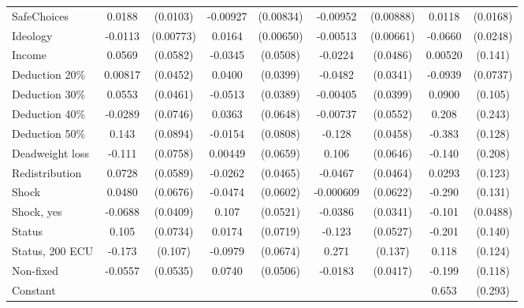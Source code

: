 \begin{tabular}{l|cccccc|cc}
SafeChoices     &   0.0188\sym{*}  & (0.0103)& -0.00927         &(0.00834)& -0.00952         &(0.00888)&   0.0118         & (0.0168)\\
Ideology        &  -0.0113         &(0.00773)&   0.0164\sym{**} &(0.00650)& -0.00513         &(0.00661)&  -0.0660\sym{**} & (0.0248)\\
Income          &   0.0569         & (0.0582)&  -0.0345         & (0.0508)&  -0.0224         & (0.0486)&  0.00520         &  (0.141)\\
Deduction 20\%&  0.00817         & (0.0452)&   0.0400         & (0.0399)&  -0.0482         & (0.0341)&  -0.0939         & (0.0737)\\
Deduction 30\%&   0.0553         & (0.0461)&  -0.0513         & (0.0389)& -0.00405         & (0.0399)&   0.0900         &  (0.105)\\
Deduction 40\%&  -0.0289         & (0.0746)&   0.0363         & (0.0648)& -0.00737         & (0.0552)&    0.208         &  (0.243)\\
Deduction 50\%&    0.143         & (0.0894)&  -0.0154         & (0.0808)&   -0.128\sym{***}& (0.0458)&   -0.383\sym{***}&  (0.128)\\
Deadweight loss&   -0.111         & (0.0758)&  0.00449         & (0.0659)&    0.106         & (0.0646)&   -0.140         &  (0.208)\\
Redistribution&   0.0728         & (0.0589)&  -0.0262         & (0.0465)&  -0.0467         & (0.0464)&   0.0293         &  (0.123)\\
Shock         &   0.0480         & (0.0676)&  -0.0474         & (0.0602)&-0.000609         & (0.0622)&   -0.290\sym{**} &  (0.131)\\
Shock, yes    &  -0.0688\sym{*}  & (0.0409)&    0.107\sym{**} & (0.0521)&  -0.0386         & (0.0341)&   -0.101\sym{**} & (0.0488)\\
Status        &    0.105         & (0.0734)&   0.0174         & (0.0719)&   -0.123\sym{**} & (0.0527)&   -0.201         &  (0.140)\\
Status, 200 ECU&   -0.173         &  (0.107)&  -0.0979         & (0.0674)&    0.271\sym{**} &  (0.137)&    0.118         &  (0.124)\\
Non-fixed     &  -0.0557         & (0.0535)&   0.0740         & (0.0506)&  -0.0183         & (0.0417)&   -0.199\sym{*}  &  (0.118)\\
Constant        &                  &         &                  &         &                  &         &    0.653\sym{**} &  (0.293)\\

\end{tabular}
